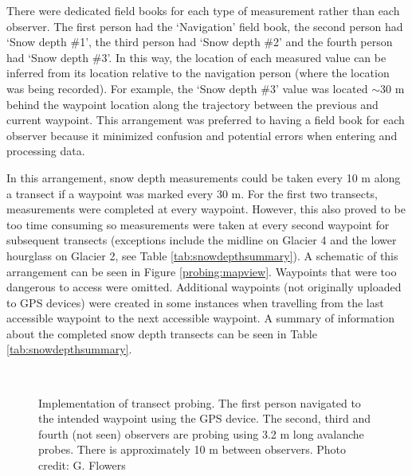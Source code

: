 \documentclass{sfuthesis}
\begin{document}
There were dedicated field books for each type of measurement rather than each observer. The first person had the `Navigation' field book, the second person had `Snow depth \#1', the third person had `Snow depth \#2' and the fourth person had `Snow depth \#3'. In this way, the location of each measured value can be inferred from its location relative to the navigation person (where the location was being recorded). For example, the `Snow depth \#3' value was located $\sim$30 m behind the waypoint location along the trajectory between the previous and current waypoint. This arrangement was preferred to having a field book for each observer because it minimized confusion and potential errors when entering and processing data.

In this arrangement, snow depth measurements could be taken every 10 m along a transect if a waypoint was marked every 30 m. For the first two transects, measurements were completed at every waypoint. However, this also proved to be too time consuming so measurements were taken at every second waypoint for subsequent transects (exceptions include the midline on Glacier 4 and the lower hourglass on Glacier 2, see Table \ref{tab:snowdepthsummary}). A schematic of this arrangement can be seen in Figure \ref{probing:mapview}. Waypoints that were too dangerous to access were omitted. Additional waypoints (not originally uploaded to GPS devices) were created in some instances when travelling from the last accessible waypoint to the next accessible waypoint. A summary of information about the completed snow depth transects can be seen in Table \ref{tab:snowdepthsummary}.

\begin{figure}[H]
	\centering
	\\
	\caption{Implementation of transect probing. The first person navigated to the intended waypoint using the GPS device. The second, third and fourth (not seen) observers are probing using 3.2 m long avalanche probes. There is approximately 10 m between observers. Photo credit: G. Flowers}
	\label{photo_probing}
	\end{figure}
\end{document}
